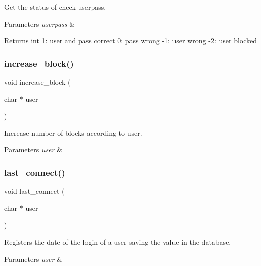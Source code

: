 Get the status of check userpass. 


\begin{DoxyParams}{Parameters}
{\em userpass} & \\
\hline
\end{DoxyParams}
\begin{DoxyReturn}{Returns}
int 1\+: user and pass correct 0\+: pass wrong -\/1\+: user wrong -\/2\+: user blocked 
\end{DoxyReturn}
\mbox{\label{auth_8c_a5477481a6cf3be8d1fea01a8d35ceff2}} 
\subsubsection{increase\+\_\+block()}
{\footnotesize\ttfamily void increase\+\_\+block (\begin{DoxyParamCaption}\item[{char $\ast$}]{user }\end{DoxyParamCaption})}



Increase number of blocks according to user. 


\begin{DoxyParams}{Parameters}
{\em user} & \\
\hline
\end{DoxyParams}
\mbox{\label{auth_8c_adedb2d3fe2edbbc0dc8873423f20a23b}} 
\subsubsection{last\+\_\+connect()}
{\footnotesize\ttfamily void last\+\_\+connect (\begin{DoxyParamCaption}\item[{char $\ast$}]{user }\end{DoxyParamCaption})}



Registers the date of the login of a user saving the value in the database. 


\begin{DoxyParams}{Parameters}
{\em user} & \\
\hline
\end{DoxyParams}
\mbox{\label{auth_8c_a057d702fc9dbc94e59ee567c7d9f0a6e}} 
